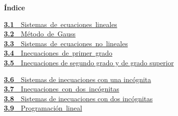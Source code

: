 \documentclass[11pt,a4paper]{article}
\begin{document}
\begin{tcolorbox}[colback=fmsurface,colframe=fmsurface,arc=3mm,left=4mm,right=4mm,top=2mm,bottom=2mm]
\small\textbf{Índice}\par\smallskip
\begin{minipage}[t]{0.49\linewidth}\small \mbox{\hyperlink{sec1}{\textbf{\color{fmgreen}3.1}\ \ Sistemas de ecuaciones lineales}}\\[3pt]
\mbox{\hyperlink{sec2}{\textbf{\color{fmgreen}3.2}\ \ Método de Gauss}}\\[3pt]
\mbox{\hyperlink{sec3}{\textbf{\color{fmgreen}3.3}\ \ Sistemas de ecuaciones no lineales}}\\[3pt]
\mbox{\hyperlink{sec4}{\textbf{\color{fmgreen}3.4}\ \ Inecuaciones de primer grado}}\\[3pt]
\hyperlink{sec5}{\textbf{\color{fmgreen}3.5}\ \ Inecuaciones de segundo grado y de grado superior}\\[3pt]\end{minipage}\hfill\begin{minipage}[t]{0.49\linewidth}\small \hyperlink{sec6}{\textbf{\color{fmgreen}3.6}\ \ Sistemas de inecuaciones con una incógnita}\\[3pt]
\mbox{\hyperlink{sec7}{\textbf{\color{fmgreen}3.7}\ \ Inecuaciones con dos incógnitas}}\\[3pt]
\hyperlink{sec8}{\textbf{\color{fmgreen}3.8}\ \ Sistemas de inecuaciones con dos incógnitas}\\[3pt]
\mbox{\hyperlink{sec9}{\textbf{\color{fmgreen}3.9}\ \ Programación lineal}}\\[3pt]\end{minipage}
\end{tcolorbox}

\Needspace{5.7cm}
\end{document}
